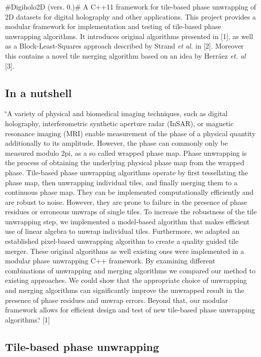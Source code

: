 \#\-Digiholo2\-D (vers. 0.)\# A C++11 framework for tile-\/based phase unwrapping of 2\-D datasets for digital holography and other applications. This project provides a modular framework for implementation and testing of tile-\/based phase unwrapping algorithms. It introduces original algorithms presented in \mbox{[}1\mbox{]}, as well as a Block-\/\-Least-\/\-Squares approach described by Strand {\itshape et al.} in \mbox{[}2\mbox{]}. Moreover this contains a novel tile merging algorithm based on an idea by Herráez {\itshape et. al} \mbox{[}3\mbox{]}.

\subsection*{In a nutshell}

\char`\"{}\-A variety of physical and biomedical imaging techniques, such as digital holography, interferometric synthetic aperture radar (\-In\-S\-A\-R), or magnetic resonance imaging (\-M\-R\-I) enable measurement of the phase of a physical quantity additionally to its amplitude. However, the phase can commonly only be measured modulo 2pi, as a so called wrapped phase map. Phase unwrapping is the process of obtaining the underlying physical phase map from the wrapped phase. Tile-\/based phase unwrapping algorithms operate by first tessellating the phase map, then unwrapping individual tiles, and finally merging them to a continuous phase map. They can be implemented computationally efficiently and are robust to noise. However, they are prone to failure in the presence of phase residues or erroneous unwraps of single tiles. To increase the robustness of the tile unwrapping step, we implemented a model-\/based algorithm that makes efficient use of linear algebra to unwrap individual tiles. Furthermore, we adapted an established pixel-\/based unwrapping algorithm to create a quality guided tile merger. These original algorithms as well existing ones were implemented in a modular phase unwrapping C++ framework. By examining different combinations of unwrapping and merging algorithms we compared our method to existing approaches. We could show that the appropriate choice of unwrapping and merging algorithms can significantly improve the unwrapped result in the presence of phase residues and unwrap errors. Beyond that, our modular framework allows for efficient design and test of new tile-\/based phase unwrapping algorithms.\char`\"{} \mbox{[}1\mbox{]}

\subsection*{Tile-\/based phase unwrapping}

